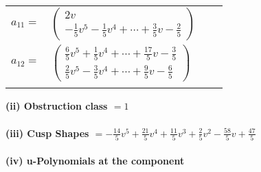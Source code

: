 \documentclass[1p]{elsarticle_modified}
\theoremstyle{definition}
\begin{document}
\begin{tabular}{m{7pt} m{180pt} m{7pt} m{180pt} }
\flushright $a_{11}=$&$\begin{pmatrix}2 v\\-\frac{1}{5} v^5-\frac{1}{5} v^4+\cdots+\frac{3}{5} v-\frac{2}{5}\end{pmatrix}$ \\
\flushright $a_{12}=$&$\begin{pmatrix}\frac{6}{5} v^5+\frac{1}{5} v^4+\cdots+\frac{17}{5} v-\frac{3}{5}\\\frac{2}{5} v^5-\frac{3}{5} v^4+\cdots+\frac{9}{5} v-\frac{6}{5}\end{pmatrix}$\\&\end{tabular}
\flushleft \textbf{(ii) Obstruction class $= 1$}\\~\\
\flushleft \textbf{(iii) Cusp Shapes $= -\frac{14}{5} v^5+\frac{21}{5} v^4+\frac{11}{5} v^3+\frac{2}{5} v^2-\frac{58}{5} v+\frac{47}{5}$}\\~\\
\newpage\renewcommand{\arraystretch}{1}
\flushleft \textbf{(iv) u-Polynomials at the component}\newline \\
\end{document}
